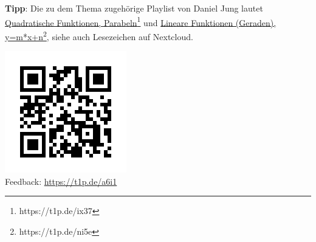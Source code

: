 \documentclass[a4paper,ngerman,12pt]{exam}
\begin{document}
\begin{questions}
\begin{solution}
	\end{solution}
















\end{questions}

\par \textbf{Tipp}: Die zu dem Thema zugehörige Playlist von Daniel Jung lautet \href{https://t1p.de/ix37}{Quadratische Funktionen, Parabeln\footnote{\url{https://t1p.de/ix37}}} und \href{https://t1p.de/ni5e}{Lineare Funktionen (Geraden), y=m*x+n\footnote{\url{https://t1p.de/ni5e}}}, siehe auch Lesezeichen auf Nextcloud.
\vspace{1cm}

\includegraphics[scale=0.4]{qr-code-t1p-de-a6i1}\\
Feedback: \href{https://t1p.de/a6i1}{https://t1p.de/a6i1}
\end{document}
